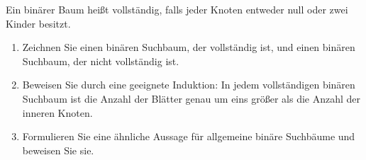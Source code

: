 \documentclass[a4paper]{assignment}
\begin{document}
\begin{problemlist}

Ein binärer Baum heißt vollständig, falls jeder Knoten entweder null oder zwei Kinder besitzt.
\begin{enumerate}
\item Zeichnen Sie einen binären Suchbaum, der vollständig ist, und einen binären Suchbaum, der nicht vollständig ist.

\item Beweisen Sie durch eine geeignete Induktion: In jedem vollständigen binären Suchbaum ist die Anzahl der Blätter genau um eins größer als die Anzahl der inneren Knoten.

\item Formulieren Sie eine ähnliche Aussage für allgemeine binäre Suchbäume und beweisen Sie sie.
\end{enumerate}







	
	
	
\end{problemlist}

\end{document}
